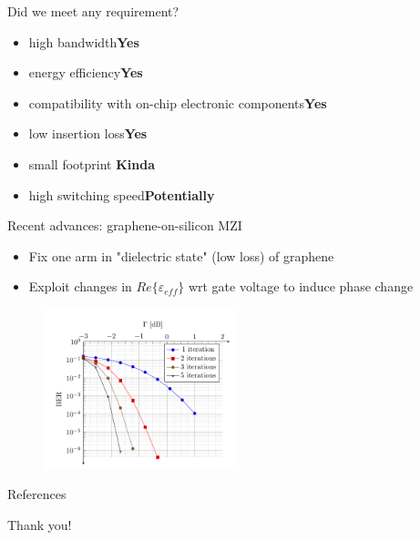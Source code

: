 \documentclass[handout,xcolor={usenames,dvipsnames},11pt]{beamer}
\begin{document}
\begin{frame}{Did we meet any requirement?}
    \pause
    \begin{itemize}
        \item high bandwidth\pause\qquad \textcolor{TolLightGreen}{\textbf{Yes}}\pause
        \item energy efficiency\pause\qquad \textcolor{TolLightGreen}{\textbf{Yes}}\pause
    \item compatibility with on-chip electronic components\pause\quad \textcolor{TolLightGreen}{\textbf{Yes}}\pause
        \item low insertion loss\pause\qquad \textcolor{TolLightGreen}{\textbf{Yes}}\pause
        \item small footprint \pause\qquad \alert{\textbf{Kinda}} \pause
        \item high switching speed\pause\qquad \alert{\textbf{Potentially}}
    \end{itemize}
\end{frame}
\begin{frame}{Recent advances: graphene-on-silicon MZI}
    \begin{itemize}
        \item Fix one arm in "dielectric state" (low loss) of graphene
        \item Exploit changes in $Re\{ \varepsilon_{eff}\}$ wrt gate voltage to induce phase change
    \end{itemize}
    \begin{figure}
        \centering
        \includegraphics[width=0.5\textwidth]{./images/BER}
        \caption{\cite{Phatak2016}}
    \end{figure}
\end{frame}
\appendix

\begin{frame}[allowframebreaks]{References}
  
  
\end{frame}

\begin{frame}[standout]
    Thank you!
\end{frame}
\end{document}
